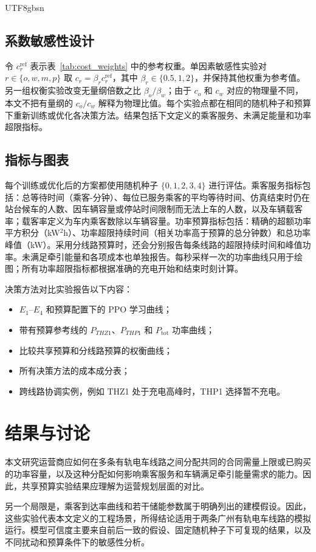 \documentclass[conference]{IEEEtran}
\newcommand{\thz}{THZ1}
\newcommand{\thp}{THP1}
\begin{document}
\begin{CJK*}{UTF8}{gbsn}
\subsection{系数敏感性设计}
令 $c_r^{\mathrm{ref}}$ 表示表~\ref{tab:cost_weights} 中的参考权重。单因素敏感性实验对 $r\in\{o,w,m,p\}$ 取 $c_r=\beta_r c_r^{\mathrm{ref}}$，其中 $\beta_r\in\{0.5,1,2\}$，并保持其他权重为参考值。另一组权衡实验改变无量纲倍数之比 $\beta_o/\beta_w$；由于 $c_o$ 和 $c_w$ 对应的物理量不同，本文不把有量纲的 $c_o/c_w$ 解释为物理比值。每个实验点都在相同的随机种子和预算下重新训练或优化各决策方法。结果包括下文定义的乘客服务、未满足能量和功率超限指标。

\subsection{指标与图表}
每个训练或优化后的方案都使用随机种子 $\{0,1,2,3,4\}$ 进行评估。乘客服务指标包括：总等待时间（乘客-分钟）、每位已服务乘客的平均等待时间、仿真结束时仍在站台候车的人数、因车辆容量或停站时间限制而无法上车的人数，以及车辆载客率；载客率定义为车内乘客数除以车辆容量。功率预算指标包括：精确的超额功率平方积分（kW$^2$h）、功率超限持续时间（相关功率高于预算的总分钟数）和总功率峰值（kW）。采用分线路预算时，还会分别报告每条线路的超限持续时间和峰值功率。未满足牵引能量和各项成本也单独报告。每秒采样一次的功率曲线只用于绘图；所有功率超限指标都根据准确的充电开始和结束时刻计算。

决策方法对比实验报告以下内容：
\begin{itemize}
    \item $E_1$--$E_4$ 和预算配置下的 PPO 学习曲线；
    \item 带有预算参考线的 $P_{\thz}$、$P_{\thp}$ 和 $P_{\mathrm{tot}}$ 功率曲线；
    \item 比较共享预算和分线路预算的权衡曲线；
    \item 所有决策方法的成本成分表；
    \item 跨线路协调实例，例如 \thz{} 处于充电高峰时，\thp{} 选择暂不充电。
\end{itemize}

\section{结果与讨论}
本文研究运营商应如何在多条有轨电车线路之间分配共同的合同需量上限或已购买的功率容量，以及这种分配如何影响乘客服务和车辆满足牵引能量需求的能力。因此，共享预算实验结果应理解为运营规划层面的对比。

另一个局限是，乘客到达率曲线和若干储能参数属于明确列出的建模假设。因此，这些实验代表本文定义的工程场景，所得结论适用于两条广州有轨电车线路的模拟运行。模型可信度主要来自前后一致的假设、固定随机种子下可复现的结果，以及不同扰动和预算条件下的敏感性分析。


\end{CJK*}
\end{document}
